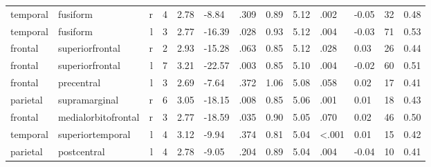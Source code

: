 \documentclass{article}
\begin{document}
\begin{longtable}{llrR{1.3cm}R{1cm}R{1.3cm}R{1cm}R{1cm}R{1.3cm}R{1cm}R{1.8cm}R{1.3cm}R{1.8cm}}
  temporal &                  fusiform &    r &         4 &                  2.78 &            -8.84 &               .309 &                               0.89 &                          5.12 &                            .002 &  -0.05 &     32 &      0.48 \\
  temporal &                  fusiform &    l &         3 &                  2.77 &           -16.39 &               .028 &                               0.93 &                          5.12 &                            .004 &  -0.03 &     71 &      0.53 \\
   frontal &           superiorfrontal &    r &         2 &                  2.93 &           -15.28 &               .063 &                               0.85 &                          5.12 &                            .028 &   0.03 &     26 &      0.44 \\
   frontal &           superiorfrontal &    l &         7 &                  3.21 &           -22.57 &               .003 &                               0.85 &                          5.10 &                            .004 &  -0.02 &     60 &      0.51 \\
   frontal &                precentral &    l &         3 &                  2.69 &            -7.64 &               .372 &                               1.06 &                          5.08 &                            .058 &   0.02 &     17 &      0.41 \\
  parietal &             supramarginal &    r &         6 &                  3.05 &           -18.15 &               .008 &                               0.85 &                          5.06 &                            .001 &   0.01 &     18 &      0.43 \\
   frontal &       medialorbitofrontal &    r &         3 &                  2.77 &           -18.59 &               .035 &                               0.90 &                          5.05 &                            .070 &   0.02 &     46 &      0.50 \\
  temporal &          superiortemporal &    l &         4 &                  3.12 &            -9.94 &               .374 &                               0.81 &                          5.04 &                   \textless.001 &   0.01 &     15 &      0.42 \\
  parietal &               postcentral &    l &         4 &                  2.78 &            -9.05 &               .204 &                               0.89 &                          5.04 &                            .004 &  -0.04 &     10 &      0.41 \\

\end{longtable}
\end{document}

